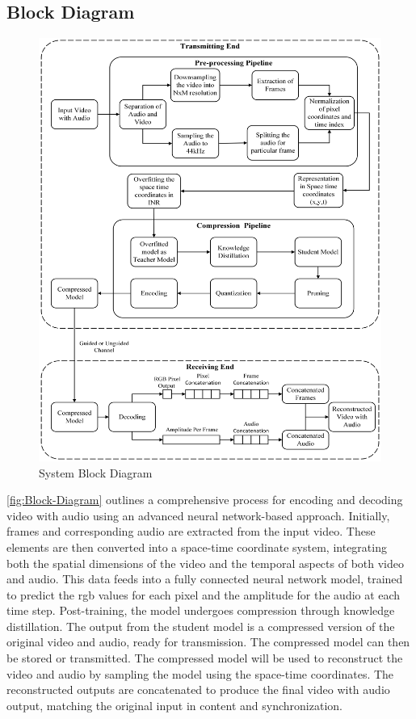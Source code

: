 \documentclass{ioereport}
\begin{document}
    \subsection{Block Diagram}
        \begin{figure}[H]
            \centering
            \includegraphics[width=\linewidth]{assets/Major Block Diagram.png}
            \caption{System Block Diagram}
            \label{fig:Block-Diagram}
        \end{figure}
        
        \autoref{fig:Block-Diagram} outlines a comprehensive process for encoding and decoding video with audio using an advanced neural network-based approach. Initially, frames and corresponding audio are extracted from the input video. These elements are then converted into a space-time coordinate system, integrating both the spatial dimensions of the video and the temporal aspects of both video and audio. This data feeds into a fully connected neural network model, trained to predict the \gls{rgb} values for each pixel and the amplitude for the audio at each time step. Post-training, the model undergoes compression through knowledge distillation. The output from the student model is a compressed version of the original video and audio, ready for transmission. The compressed model can then be stored or transmitted. The compressed model will be used to reconstruct the video and audio by sampling the model using the space-time coordinates. The reconstructed outputs are concatenated to produce the final video with audio output, matching the original input in content and synchronization.
\end{document}
